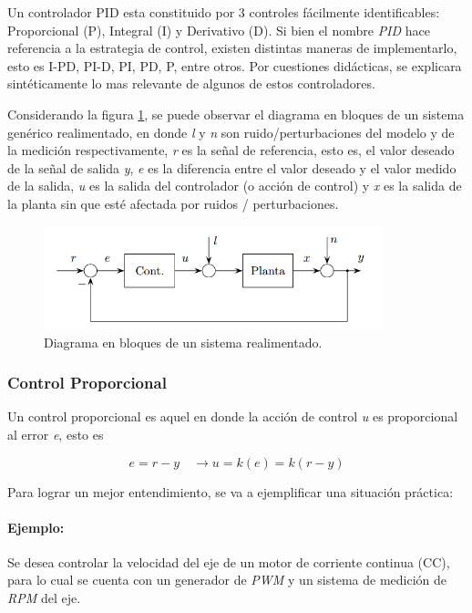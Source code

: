 \documentclass[10pt,conference,a4paper,onecolumn]{article}%
\begin{document}
Un controlador PID esta constituido por 3 controles fácilmente identificables: Proporcional (P), Integral (I) y Derivativo (D). Si bien el nombre \textit{PID} hace referencia a la estrategia de control, existen distintas maneras de implementarlo, esto es I-PD, PI-D, PI, PD, P, entre otros. Por cuestiones didácticas, se explicara sintéticamente lo mas relevante de algunos de estos controladores.


Considerando la figura \ref{fig:sis_generico}, se puede observar el diagrama en bloques de un sistema genérico realimentado, en donde \textit{l} y \textit{n} son ruido/perturbaciones del modelo y de la medición respectivamente,   \textit{r} es la señal de referencia, esto es, el valor deseado de la señal de salida \textit{y}, \textit{e} es la diferencia entre el valor deseado y el valor medido de la salida,    \textit{u} es la salida del controlador (o acción de control) y  \textit{x} es la salida de la planta sin que esté afectada por ruidos / perturbaciones.

\begin{figure}[h]
\centering
\includegraphics[height=3cm]{./imagenes/sis_realim_generico.png}
\caption{Diagrama en bloques de un sistema realimentado.}
\label{fig:sis_generico}
\end{figure}


\subsubsection{Control Proporcional}
Un control proporcional es aquel en donde la acción de control \textit{u} es proporcional al error \textit{e}, esto es

\begin{equation}
e=r-y \quad \rightarrow u=k(e)=k (r-y)
\end{equation}

Para lograr un mejor entendimiento, se va a ejemplificar una situación práctica:
\paragraph{Ejemplo:} Se desea controlar la velocidad del eje de un motor de corriente continua (CC), para lo cual se cuenta con un generador de \textit{PWM} y un sistema de medición de \textit{RPM} del eje.
\end{document}
